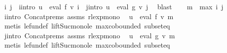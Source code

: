 \begin{isabellebody}
\ i\ j\ \ i{\isacharunderscore}{\kern0pt}intro{\isacharcolon}{\kern0pt}\ {\isachardoublequoteopen}u\ {\isasymin}\ eval\ f\ {\isacharparenleft}{\kern0pt}v\ i{\isacharparenright}{\kern0pt}{\isachardoublequoteclose}\ \ j{\isacharunderscore}{\kern0pt}intro{\isacharcolon}{\kern0pt}\ {\isachardoublequoteopen}u{\isacharprime}{\kern0pt}\ {\isasymin}\ eval\ g\ {\isacharparenleft}{\kern0pt}v\ j{\isacharparenright}{\kern0pt}{\isachardoublequoteclose}\ \isamarkupfalse%
\ blast\isanewline
\ \ \isamarkupfalse%
\ {\isacharquery}{\kern0pt}m\ {\isacharequal}{\kern0pt}\ {\isachardoublequoteopen}max\ i\ j{\isachardoublequoteclose}\isanewline
\ \ \isamarkupfalse%
\ i{\isacharunderscore}{\kern0pt}intro\ Concat{\isachardot}{\kern0pt}prems{\isacharparenleft}{\kern0pt}{}{\isacharparenright}{\kern0pt}\ assms{\isacharparenleft}{\kern0pt}{}{\isacharparenright}{\kern0pt}\ rlexp{\isacharunderscore}{\kern0pt}mono\ \isamarkupfalse%
\ {\isachardoublequoteopen}u\ {\isasymin}\ eval\ f\ {\isacharparenleft}{\kern0pt}v\ {\isacharquery}{\kern0pt}m{\isacharparenright}{\kern0pt}{\isachardoublequoteclose}\isanewline
\ \ \ \ \isamarkupfalse%
\ {\isacharparenleft}{\kern0pt}metis\ le{\isacharunderscore}{\kern0pt}fun{\isacharunderscore}{\kern0pt}def\ lift{\isacharunderscore}{\kern0pt}Suc{\isacharunderscore}{\kern0pt}mono{\isacharunderscore}{\kern0pt}le\ max{\isachardot}{\kern0pt}cobounded{}\ subset{\isacharunderscore}{\kern0pt}eq{\isacharparenright}{\kern0pt}\isanewline
\ \ \isamarkupfalse%
\ \isamarkupfalse%
\ j{\isacharunderscore}{\kern0pt}intro\ Concat{\isachardot}{\kern0pt}prems{\isacharparenleft}{\kern0pt}{}{\isacharparenright}{\kern0pt}\ assms{\isacharparenleft}{\kern0pt}{}{\isacharparenright}{\kern0pt}\ rlexp{\isacharunderscore}{\kern0pt}mono\ \isamarkupfalse%
\ {\isachardoublequoteopen}u{\isacharprime}{\kern0pt}\ {\isasymin}\ eval\ g\ {\isacharparenleft}{\kern0pt}v\ {\isacharquery}{\kern0pt}m{\isacharparenright}{\kern0pt}{\isachardoublequoteclose}\isanewline
\ \ \ \ \isamarkupfalse%
\ {\isacharparenleft}{\kern0pt}metis\ le{\isacharunderscore}{\kern0pt}fun{\isacharunderscore}{\kern0pt}def\ lift{\isacharunderscore}{\kern0pt}Suc{\isacharunderscore}{\kern0pt}mono{\isacharunderscore}{\kern0pt}le\ max{\isachardot}{\kern0pt}cobounded{}\ subset{\isacharunderscore}{\kern0pt}eq{\isacharparenright}{\kern0pt}\isanewline

\end{isabellebody}
